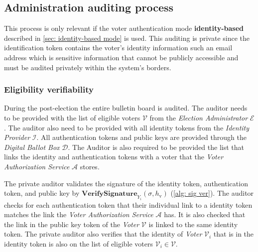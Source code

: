 \subsection{Administration auditing process} \label{sec: administration auditing process}
This process is only relevant if the voter authentication mode \textbf{identity-based} described in \cref{sec: identity-based mode} is used. This auditing is private since the identification token contains the voter's identity information such an email address which is sensitive information that cannot be publicly accessible and must be audited privately within the system's borders.


\subsubsection{Eligibility verifiability}
During the post-election the entire bulletin board is audited. The auditor needs to be provided with the list of eligible voters $\boldsymbol{\mathcal{V}}$ from the \textit{Election Administrator} $\mathcal{E}$. The auditor also need to be provided with all identity tokens from the \textit{Identity Provider} $\mathcal{I}$. All authentication tokens and public keys are provided through the \textit{Digital Ballot Box} $\mathcal{D}$. The Auditor is also required to be provided the list that links the identity and authentication tokens with a voter that the \textit{Voter Authorization Service} $\mathcal{A}$ stores. 

The private auditor validates the signature of the identity token, authentication token, and public key by \( \mathbf{VerifySignature}_{Y_i} (\sigma, h_\mathrm{v}) \) (\cref{alg: sig ver}). The auditor checks for each authentication token that their individual link to a identity token matches the link the \textit{Voter Authorization Service} $\mathcal{A}$ has. It is also checked that the link in the public key token of the \textit{Voter} $\mathcal{V}$ is linked to the same identity token. The private auditor also verifies that the identity of \textit{Voter} $\mathcal{V}_i$ that is in the identity token is also on the list of eligible voters $\mathcal{V}_i \in \boldsymbol{\mathcal{V}}$. 
